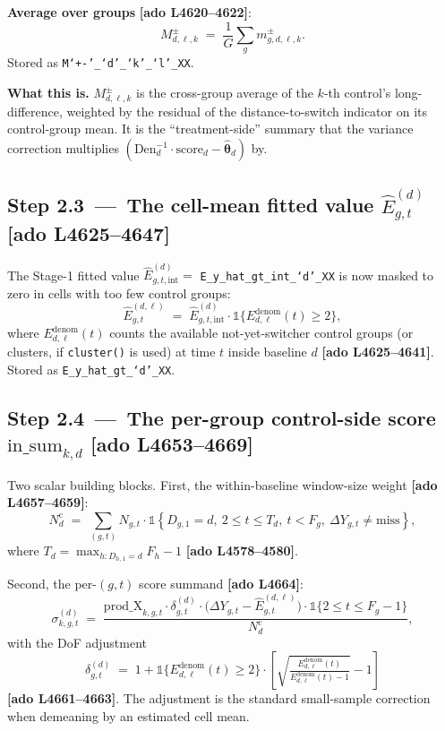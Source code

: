 \documentclass[11pt]{article}
\newcommand{\code}[1]{\texttt{\small #1}}
\newcommand{\Adoref}[1]{\textcolor{accent}{\footnotesize\textbf{[ado L#1]}}}
\newcommand{\1}{\mathbb{1}}
\newcommand{\thetad}{\widehat{\bm{\theta}}_d}
\newcommand{\Ngt}{N_{g,t}}
\begin{document}
\textbf{Average over groups} \Adoref{4620--4622}:
\begin{equation}
\boxed{\;M^{\pm}_{d,\ell,k} \;=\; \frac{1}{G}\sum_{g} m^{\pm}_{g,d,\ell,k}.\;}
\label{eq:Mdlk}
\end{equation}
Stored as \code{M`+\!-'\_`d'\_`k'\_`l'\_XX}.

\medskip\noindent
\textbf{What this is.} $M^{\pm}_{d,\ell,k}$ is the cross-group average of the
$k$-th control's long-difference, weighted by the residual of
the distance-to-switch indicator on its control-group mean. It is the
``treatment-side'' summary that the variance correction multiplies
$(\mathrm{Den}_d^{-1}\cdot\mathrm{score}_d - \thetad)$ by.

\subsection*{Step 2.3 \,---\, The cell-mean fitted value $\widehat{E}^{(d)}_{g,t}$ \Adoref{4625--4647}}

The Stage-1 fitted value $\widehat{E}^{(d)}_{g,t,\mathrm{int}} =$
\code{E\_y\_hat\_gt\_int\_`d'\_XX} is now masked to zero in
cells with too few control groups:
\begin{equation}
\widehat{E}^{(d,\ell)}_{g,t} \;=\; \widehat{E}^{(d)}_{g,t,\mathrm{int}}\cdot \1\!\bigl\{E^{\mathrm{denom}}_{d,\ell}(t) \ge 2\bigr\},
\label{eq:Ehat}
\end{equation}
where $E^{\mathrm{denom}}_{d,\ell}(t)$ counts the available not-yet-switcher
control groups (or clusters, if \code{cluster()} is used) at time $t$ inside
baseline $d$ \Adoref{4625--4641}. Stored as \code{E\_y\_hat\_gt\_`d'\_XX}.

\subsection*{Step 2.4 \,---\, The per-group control-side score $\mathrm{in\_sum}_{k,d}$ \Adoref{4653--4669}}

Two scalar building blocks. First, the within-baseline window-size weight
\Adoref{4657--4659}:
\begin{equation}
N^{\mathrm{c}}_d \;=\; \sum_{(g,t)} \Ngt\cdot \1\!\left\{D_{g,1}=d,\ 2\le t\le T_d,\ t<F_g,\ \Delta Y_{g,t}\ne\text{miss}\right\},
\label{eq:Nc}
\end{equation}
where $T_d = \max_{h:D_{h,1}=d} F_h - 1$ \Adoref{4578--4580}.

\medskip
Second, the per-$(g,t)$ score summand \Adoref{4664}:
\begin{equation}
\sigma^{(d)}_{k,g,t} \;=\; \frac{\mathrm{prod\_X}_{k,g,t}\cdot \delta^{(d)}_{g,t}\cdot \bigl(\Delta Y_{g,t} - \widehat{E}^{(d,\ell)}_{g,t}\bigr)\cdot \1\{2\le t\le F_g{-}1\}}{N^{\mathrm{c}}_d},
\label{eq:sigma}
\end{equation}
with the DoF adjustment
\begin{equation}
\delta^{(d)}_{g,t} \;=\; 1 + \1\!\bigl\{E^{\mathrm{denom}}_{d,\ell}(t) \ge 2\bigr\}\cdot
\left[\sqrt{\tfrac{E^{\mathrm{denom}}_{d,\ell}(t)}{E^{\mathrm{denom}}_{d,\ell}(t)-1}}-1\right]
\label{eq:dof}
\end{equation}
\Adoref{4661--4663}. The adjustment is the standard small-sample correction
when demeaning by an estimated cell mean.
\end{document}

